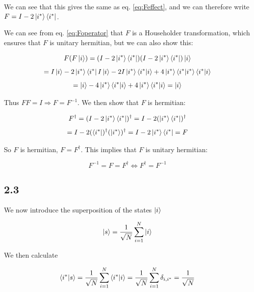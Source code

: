 \documentclass[a4paper,norsk, 10pt]{article}
\begin{document}
We can see that this gives the same as eq. \eqref{eq:Feffect}, and we can therefore write $F = I - 2\ket{i^*}\bra{i^*}$.

We can see from eq. \ref{eq:Foperator} that $F$ is a Householder transformation, which ensures that $F$ is unitary hermitian, but we can also show this:

\begin{equation}
F(F\ket{i}) = (I - 2\ket{i^*}\bra{i^*})(I - 2\ket{i^*}\bra{i^*})\ket{i}
\end{equation}
\begin{equation}
= I\ket{i} - 2\ket{i^*}\bra{i^*}I\ket{i} -2I\ket{i^*}\bra{i^*}\ket{i} + 4\ket{i^*}\bra{i^*}\ket{i^*}\bra{i^*}\ket{i}
\end{equation}
\begin{equation}
= \ket{i} - 4\ket{i^*}\bra{i^*}\ket{i} + 4\ket{i^*}\bra{i^*}\ket{i} = \ket{i}
\end{equation}

Thus $FF = I \Rightarrow F = F^{-1}$. We then show that $F$ is hermitian:

\begin{equation}
F^\dagger = (I - 2\ket{i^*}\bra{i^*})^\dagger = I - 2(\ket{i^*}\bra{i^*})^\dagger
\end{equation}
\begin{equation}
= I - 2(\bra{i^*})^\dagger(\ket{i^*})^\dagger = I - 2\ket{i^*}\bra{i^*} = F
\end{equation}

So $F$ is hermitian, $F = F^\dagger$. This implies that $F$ is unitary hermitian:

\begin{equation}
F^{-1} = F = F^\dagger \Leftrightarrow F^\dagger = F^{-1}
\end{equation}


\subsection{2.3}
We now introduce the superposition of the states $\ket{i}$

\begin{equation}
\ket{s} = \frac{1}{\sqrt{N}} \sum_{i=1}^N \ket{i}
\end{equation}

We then calculate 

\begin{equation}
\braket{i^*}{s} = \frac{1}{\sqrt{N}} \sum_{i=1}^N \braket{i^*}{i} = \frac{1}{\sqrt{N}} \sum_{i=1}^N \delta_{i,i^*} = \frac{1}{\sqrt{N}} 
\label{eq:is}
\end{equation}
\end{document}
